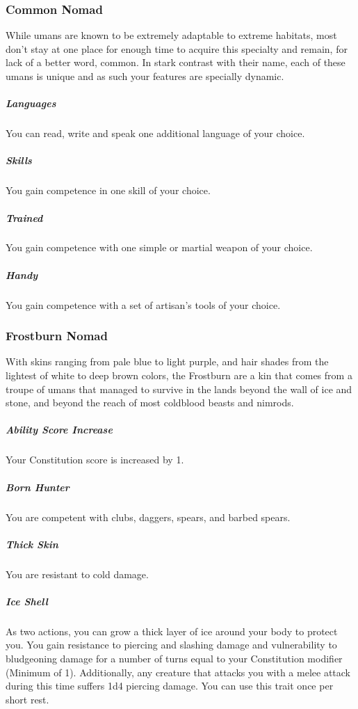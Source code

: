 \begin{linenumbers}
\subsubsection{Common Nomad}
While umans are known to be extremely adaptable to extreme habitats, most don't stay at one place for enough time to acquire this specialty and remain, for lack of a better word, common.
In stark contrast with their name, each of these umans is unique and as such your features are specially dynamic.

\subparagraph{Languages} You can read, write and speak one additional language of your choice.

\subparagraph{Skills} You gain competence in one skill of your choice.

\subparagraph{Trained} You gain competence with one simple or martial weapon of your choice.

\subparagraph{Handy} You gain competence with a set of artisan's tools of your choice.


\subsubsection{Frostburn Nomad}
With skins ranging from pale blue to light purple, and hair shades from the lightest of white to deep brown colors, the Frostburn are a kin that comes from a troupe of umans that managed to survive in the lands beyond the wall of ice and stone, and beyond the reach of most coldblood beasts and nimrods.

\subparagraph{Ability Score Increase} Your Constitution score is increased by 1.


\subparagraph{Born Hunter} You are competent with clubs, daggers, spears, and barbed spears.

\subparagraph{Thick Skin} %
You are resistant to cold damage.%

\subparagraph{Ice Shell} As two actions, you can grow a thick layer of ice around your body to protect you.
You gain resistance to piercing and slashing damage and vulnerability to bludgeoning damage for a number of turns equal to your Constitution modifier (Minimum of 1).
Additionally, any creature that attacks you with a melee attack during this time suffers 1d4 piercing damage.
You can use this trait once per short rest.


\end{linenumbers}
